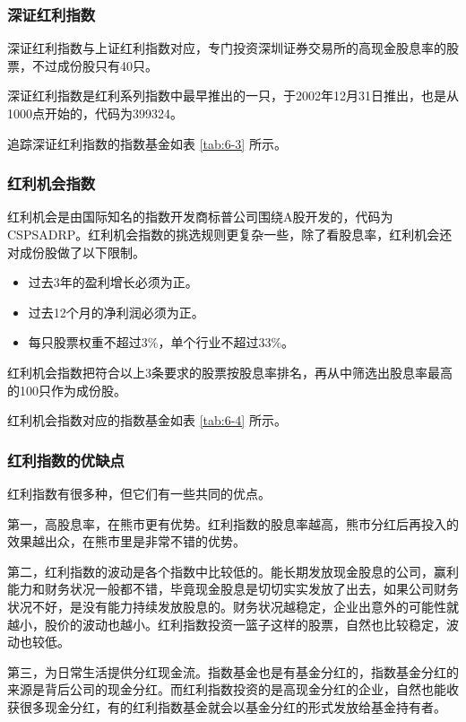 \subsubsection{深证红利指数}

深证红利指数与上证红利指数对应，专门投资深圳证券交易所的高现金股息率的股票，不过成份股只有40只。

深证红利指数是红利系列指数中最早推出的一只，于2002年12月31日推出，也是从1000点开始的，代码为399324。

追踪深证红利指数的指数基金如表 \ref{tab:6-3} 所示。



\subsubsection{红利机会指数}

红利机会是由国际知名的指数开发商标普公司围绕A股开发的，代码为CSPSADRP。红利机会指数的挑选规则更复杂一些，除了看股息率，红利机会还对成份股做了以下限制。

\begin{itemize}
\item 过去3年的盈利增长必须为正。
\item 过去12个月的净利润必须为正。
\item 每只股票权重不超过3\%，单个行业不超过33\%。
\end{itemize}

红利机会指数把符合以上3条要求的股票按股息率排名，再从中筛选出股息率最高的100只作为成份股。

红利机会指数对应的指数基金如表 \ref{tab:6-4} 所示。



\subsubsection{红利指数的优缺点}

红利指数有很多种，但它们有一些共同的优点。

第一，高股息率，在熊市更有优势。红利指数的股息率越高，熊市分红后再投入的效果越出众，在熊市里是非常不错的优势。

第二，红利指数的波动是各个指数中比较低的。能长期发放现金股息的公司，赢利能力和财务状况一般都不错，毕竟现金股息是切切实实发放了出去，如果公司财务状况不好，是没有能力持续发放股息的。财务状况越稳定，企业出意外的可能性就越小，股价的波动也越小。红利指数投资一篮子这样的股票，自然也比较稳定，波动也较低。

第三，为日常生活提供分红现金流。指数基金也是有基金分红的，指数基金分红的来源是背后公司的现金分红。而红利指数投资的是高现金分红的企业，自然也能收获很多现金分红，有的红利指数基金就会以基金分红的形式发放给基金持有者。

